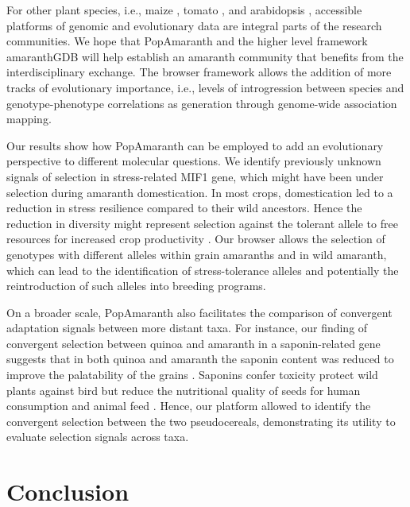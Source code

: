 \documentclass[9pt,twocolumn,twoside]{celabRxiv}
\begin{document}
For other plant species, i.e., maize \citep{lawrence2004maizegdb}, tomato \citep{fernandez2015sol}, and arabidopsis \citep{weigel20091001, 1001:2016}, accessible platforms of genomic and evolutionary data are integral parts of the research communities. 
We hope that PopAmaranth and the higher level framework amaranthGDB will help establish an amaranth community that benefits from the interdisciplinary exchange.
The browser framework allows the addition of more tracks of evolutionary importance, i.e., levels of introgression between species and genotype-phenotype correlations as generation through genome-wide association mapping.

Our results show how PopAmaranth can be employed to add an evolutionary perspective to different molecular questions. 
We identify previously unknown signals of selection in stress-related MIF1 gene, which might have been under selection during amaranth domestication. 
In most crops, domestication led to a reduction in stress resilience compared to their wild ancestors. 
Hence the reduction in diversity might represent selection against the tolerant allele to free resources for increased crop productivity \citep{koziol2012reduced}. 
Our browser allows the selection of genotypes with different alleles within grain amaranths and in wild amaranth, which can lead to the identification of stress-tolerance alleles and potentially the reintroduction of such alleles into breeding programs.

On a broader scale, PopAmaranth also facilitates the comparison of convergent adaptation signals between more distant taxa. 
For instance, our finding of convergent selection between quinoa and amaranth in a saponin-related gene suggests that in both quinoa and amaranth the saponin content was reduced to improve the palatability of the grains \citep{jarvis2017genome}. 
Saponins confer toxicity protect wild plants against bird but reduce the nutritional quality of seeds for human consumption and animal feed \citep{rastrelli1995studies, rastrelli1998studies, oleszek1999determination, mroczek2015phytochemistry}. 
Hence, our platform allowed to identify the convergent selection between the two pseudocereals, demonstrating its utility to evaluate selection signals across taxa.

\section{Conclusion}
\end{document}
